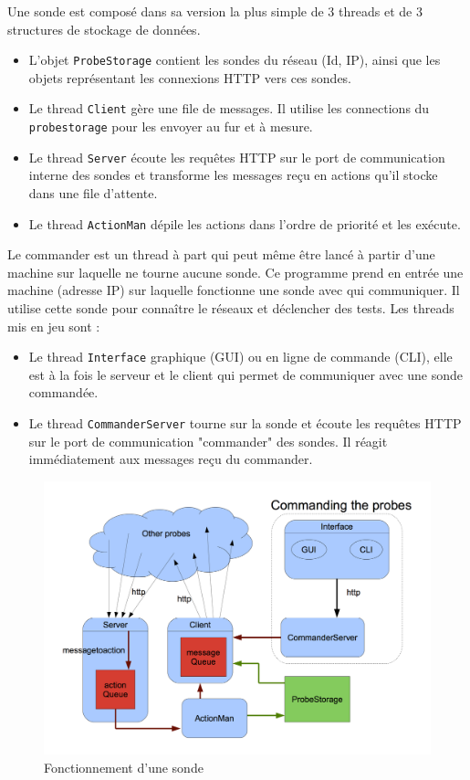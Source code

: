 \documentclass[a4paper,11pt]{article}
\newcommand{\cd}[1]{\texttt{#1}}
\begin{document}
Une sonde est composé dans sa version la plus simple de 3 threads et de 3 structures de stockage de données.
\begin{itemize}
\item L'objet \cd{ProbeStorage} contient les sondes du réseau (Id, IP), ainsi que les objets représentant les connexions HTTP vers ces sondes.
\item Le thread \cd{Client} gère une file de messages. Il utilise les connections du \cd{probestorage} pour les envoyer au fur et à mesure.
\item Le thread \cd{Server} écoute les requêtes HTTP sur le port de communication interne des sondes et transforme les messages reçu en actions qu'il stocke dans une file d'attente.
\item Le thread \cd{ActionMan} dépile les actions dans l'ordre de priorité et les exécute.
\end{itemize}
Le commander est un thread à part qui peut même être lancé à partir d'une machine sur laquelle ne tourne aucune sonde. Ce programme prend en entrée une machine (adresse IP) sur laquelle fonctionne une sonde avec qui communiquer. Il utilise cette sonde pour connaître le réseaux et déclencher des tests.
Les threads mis en jeu sont :
\begin{itemize}
\item Le thread \cd{Interface} graphique (GUI) ou en ligne de commande (CLI), elle est à la fois le serveur et le client qui permet de communiquer avec une sonde commandée.
\item Le thread \cd{CommanderServer} tourne sur la sonde et écoute les requêtes HTTP sur le port de communication "commander" des sondes. Il réagit immédiatement aux messages reçu du commander.
\end{itemize}

\begin{figure}[!ht]
\centering\includegraphics[width=\linewidth]{img/graphCommander.png}
\caption{Fonctionnement d'une sonde}
\end{figure}
\end{document}
